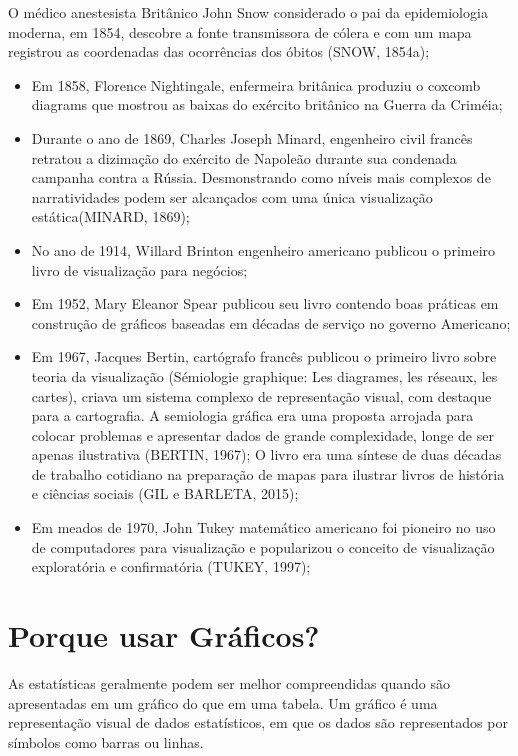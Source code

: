 \documentclass[
  letterpaper,
  DIV=11,
  numbers=noendperiod]{scrreprt}
\begin{document}
O médico anestesista Britânico John Snow considerado o pai da
epidemiologia moderna, em 1854, descobre a fonte transmissora de cólera
e com um mapa registrou as coordenadas das ocorrências dos óbitos (SNOW,
1854a);

\begin{itemize}
\item
  Em 1858, Florence Nightingale, enfermeira britânica produziu o coxcomb
  diagrams que mostrou as baixas do exército britânico na Guerra da
  Criméia;
\item
  Durante o ano de 1869, Charles Joseph Minard, engenheiro civil francês
  retratou a dizimação do exército de Napoleão durante sua condenada
  campanha contra a Rússia. Desmonstrando como níveis mais complexos de
  narratividades podem ser alcançados com uma única visualização
  estática(MINARD, 1869);
\item
  No ano de 1914, Willard Brinton engenheiro americano publicou o
  primeiro livro de visualização para negócios;
\item
  Em 1952, Mary Eleanor Spear publicou seu livro contendo boas práticas
  em construção de gráficos baseadas em décadas de serviço no governo
  Americano;
\item
  Em 1967, Jacques Bertin, cartógrafo francês publicou o primeiro livro
  sobre teoria da visualização (Sémiologie graphique: Les diagrames, les
  réseaux, les cartes), criava um sistema complexo de representação
  visual, com destaque para a cartografia. A semiologia gráfica era uma
  proposta arrojada para colocar problemas e apresentar dados de grande
  complexidade, longe de ser apenas ilustrativa (BERTIN, 1967); O livro
  era uma síntese de duas décadas de trabalho cotidiano na preparação de
  mapas para ilustrar livros de história e ciências sociais (GIL e
  BARLETA, 2015);
\item
  Em meados de 1970, John Tukey matemático americano foi pioneiro no uso
  de computadores para visualização e popularizou o conceito de
  visualização exploratória e confirmatória (TUKEY, 1997);
\end{itemize}

\hypertarget{porque-usar-gruxe1ficos}{%
\section{Porque usar Gráficos?}\label{porque-usar-gruxe1ficos}}

As estatísticas geralmente podem ser melhor compreendidas quando são
apresentadas em um gráfico do que em uma tabela. Um gráfico é uma
representação visual de dados estatísticos, em que os dados são
representados por símbolos como barras ou linhas.
\end{document}
